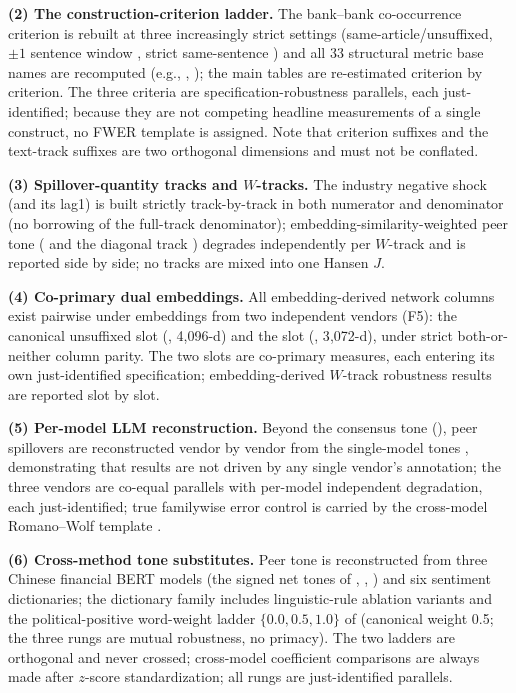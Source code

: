 \textbf{(2) The construction-criterion ladder.} The bank--bank
co-occurrence criterion is rebuilt at three increasingly strict
settings (same-article/unsuffixed, $\pm 1$ sentence window
, strict same-sentence ) and all 33
structural metric base names are recomputed (e.g.,
,
); the main tables are
re-estimated criterion by criterion. The three criteria are
specification-robustness parallels, each just-identified; because
they are not competing headline measurements of a single construct,
no FWER template is assigned. Note that criterion suffixes and the
text-track suffixes are two orthogonal dimensions and must not be
conflated.

\textbf{(3) Spillover-quantity tracks and $W$-tracks.} The industry
negative shock  (and its
lag1) is built strictly track-by-track in both numerator and
denominator (no borrowing of the full-track denominator);
embedding-similarity-weighted peer tone
( and the diagonal
track ) degrades
independently per $W$-track and is reported side by side; no tracks
are mixed into one Hansen $J$.

\textbf{(4) Co-primary dual embeddings.} All embedding-derived
network columns exist pairwise under embeddings from two independent
vendors (F5): the canonical unsuffixed slot
(, 4{,}096-d) and the  slot
(, 3{,}072-d), under strict
both-or-neither column parity. The two slots are co-primary
measures, each entering its own just-identified specification;
embedding-derived $W$-track robustness results are reported slot by
slot.

\textbf{(5) Per-model LLM reconstruction.} Beyond the consensus
tone (), peer spillovers are reconstructed
vendor by vendor from the single-model tones
, demonstrating
that results are not driven by any single vendor's annotation; the
three vendors are co-equal parallels with per-model independent
degradation, each just-identified; true familywise error control is
carried by the cross-model Romano--Wolf template
\parencite{romano2005stepwise}.

\textbf{(6) Cross-method tone substitutes.} Peer tone is
reconstructed from three Chinese financial BERT models (the signed
net tones of , ,
) and six sentiment dictionaries; the dictionary
family includes linguistic-rule ablation variants and the
political-positive word-weight ladder $\{0.0, 0.5, 1.0\}$ of
\textcite{du2022language} (canonical weight 0.5; the three rungs are
mutual robustness, no primacy). The two ladders are orthogonal and
never crossed; cross-model coefficient comparisons are always made
after $z$-score standardization; all rungs are just-identified
parallels.

